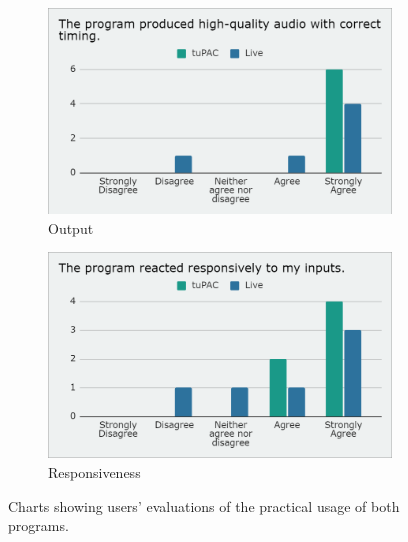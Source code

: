 \documentclass[12pt,a4paper,oneside,openright]{report}
\begin{document}
\begin{figure}[h]
\centering
\begin{subfigure}{.5\textwidth}
  \centering
  \includegraphics[width=.9\linewidth]{images/questionnaire/functionality.png}
  \caption{Output}
  \label{fig:q_funct}
\end{subfigure}%
\begin{subfigure}{.5\textwidth}
  \centering
  \includegraphics[width=.9\linewidth]{images/questionnaire/responsiveness.png}
  \caption{Responsiveness}
  \label{fig:q_resp}
\end{subfigure}
\caption{Charts showing users' evaluations of the practical usage of both programs.}
\label{fig:q_1}
\end{figure}
\end{document}
